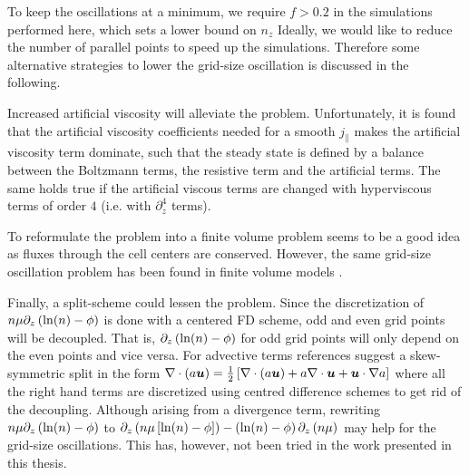 To keep the oscillations at a minimum, we require $f > 0.2$ in the simulations performed here, which sets a lower bound on $n_z$
Ideally, we would like to reduce the number of parallel points to speed up the simulations.
Therefore some alternative strategies to lower the grid-size oscillation is discussed in the following.

Increased artificial viscosity will alleviate the problem.
Unfortunately, it is found that the artificial viscosity coefficients needed for a smooth $j_\|$ makes the artificial viscosity term dominate, such that the steady state is defined by a balance between the Boltzmann terms, the resistive term and the artificial terms.
The same holds true if the artificial viscous terms are changed with hyperviscous terms of order $4$ (i.e. with $\partial_z^4$ terms).

To reformulate the problem into a finite volume problem seems to be a good idea as fluxes through the cell centers are conserved.
However, the same grid-size oscillation problem has been found in finite volume models \cite{Dudson2017Private}.

Finally, a split-scheme could lessen the problem.
Since the discretization of $n\mu\partial_z\left(\ln(n)-\phi\right)$ is done with a centered FD scheme, odd and even grid points will be decoupled.
That is, $\partial_z\left(\ln(n)-\phi\right)$ for odd grid points will only depend on the even points and vice versa.
For advective terms references \cite{Honein2004,Pirozzoli2011} suggest a skew-symmetric split in the form $\nabla\cdot\left(a\boldsymbol{u}\right) = \frac{1}{2}\left[\nabla\cdot\left(a\boldsymbol{u}\right) + a\nabla\cdot\boldsymbol{u} + \boldsymbol{u}\cdot\nabla a\right]$ where all the right hand terms are discretized using centred difference schemes to get rid of the decoupling.
Although arising from a divergence term, rewriting $n\mu\partial_z\left(\ln(n)-\phi\right)$ to $\partial_z\left(n\mu\left[\ln(n)-\phi\right]\right)-\left(\ln(n)-\phi\right)\partial_z\left(n\mu\right)$ may help for the grid-size oscillations.
This has, however, not been tried in the work presented in this thesis.
